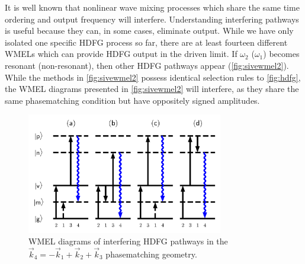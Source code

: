 \documentclass[aip, jcp, reprint, onecolumn]{revtex4-2}
\begin{document}
It is well known that nonlinear wave mixing processes which share the same time ordering and output frequency will interfere. \cite{RN342, RN135}
Understanding interfering pathways is useful because they can, in some cases, eliminate output. 
While we have only isolated one specific HDFG process so far, there are at least fourteen different WMELs which can provide HDFG output in the driven limit. \cite{RN352}
If $\omega_2$ ($\omega_1$) becomes resonant (non-resonant), then other HDFG pathways appear (\autoref{fig:sivewmel2}).\cite{McDonnell2024} 
While the methods in \autoref{fig:sivewmel2} possess identical selection rules to \autoref{fig:hdfg}, the WMEL diagrams presented in \autoref{fig:sivewmel2} will interfere, as they share the same phasematching condition but have oppositely signed amplitudes.
\begin{figure}[!htbp]
	\centering
	\includegraphics[width=3.375in]{figures/timeorderedwmel.png}
	\caption{WMEL diagrams of interfering HDFG pathways in the  $\vec{k}_4 = -\vec{k}_1 + \vec{k}_2 + \vec{k}_3$ phasematching geometry. 
		}
	\label{fig:sivewmel2}
\end{figure}
\end{document}
